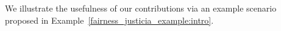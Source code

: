 
We illustrate the usefulness of our contributions via an example scenario proposed in Example~\ref{fairness_justicia_example:intro}. 




